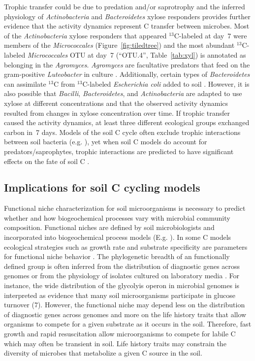 Trophic transfer could be due to predation and/or saprotrophy and the inferred
physiology of \textit{Actinobacteria} and \textit{Bacteroidetes} xylose
responders provides further evidence that the activity dynamics represent 
C transfer between microbes. Most of the \textit{Actinobacteria} xylose
responders that appeared $^{13}$C-labeled at day~7 were members of the
\textit{Micrococcales} (Figure~\ref{fig:tiledtree}) and the most abundant
$^{13}$C-labeled \textit{Micrococcales} OTU at day~7 (“OTU.4”,
Table~\ref{tab:xyl}) is annotated as belonging in the \textit{Agromyces}.
\textit{Agromyces} are facultative predators that feed on the gram-positive
\textit{Luteobacter} in culture \citep{16346402}. Additionally, certain types
of \textit{Bacteroidetes} can assimilate $^{13}$C from $^{13}$C-labeled
\textit{Escherichia coli} added to soil \citep{Lueders2006}. However, it is
also possible that \textit{Bacilli}, \textit{Bacteroidetes}, and
\textit{Actinobacteria} are adapted to use xylose at different concentrations
and that the observed activity dynamics resulted from changes in xylose
concentration over time. If trophic transfer caused the activity dynamics,
at least three different ecological groups exchanged carbon in~7 days.
Models of the soil C cycle often exclude trophic interactions between soil
bacteria (e.g. \citep{Moore1988}), yet when soil C models do account for
predators/saprophytes, trophic interactions are predicted to have
significant effects on the fate of soil C \citep{Kaiser2014a}. 

\subsection{Implications for soil C cycling models}
Functional niche characterization for soil microorganisms is necessary to
predict whether and how biogeochemical processes vary with microbial community
composition. Functional niches are defined by soil microbiologists and
incorporated into biogeochemical process models (E.g.
\citep{wieder_2014a,Kaiser2014a}). In some C models ecological strategies such
as growth rate and substrate specificity are parameters for functional niche
behavior \citep{Kaiser2014a}. The phylogenetic breadth of an functionally
defined group is often inferred from the distribution of diagnostic genes
across genomes \citep{Berlemont2013} or from the physiology of isolates
cultured on laboratory media \citep{Martiny2013}. For instance, the wide
distribution of the glycolyis operon in microbial genomes is interpreted as
evidence that many soil microorganisms participate in glucose turnover (7).
However, the functional niche may depend less on the distribution of diagnostic
genes across genomes and more on the life history traits that allow organisms
to compete for a given substrate as it occurs in the soil.
Therefore, fast growth and rapid resuscitation allow microorganisms to
compete for labile C which may often be transient in soil. Life
history traits may constrain the diversity of
microbes that metabolize a given C source in the soil.

